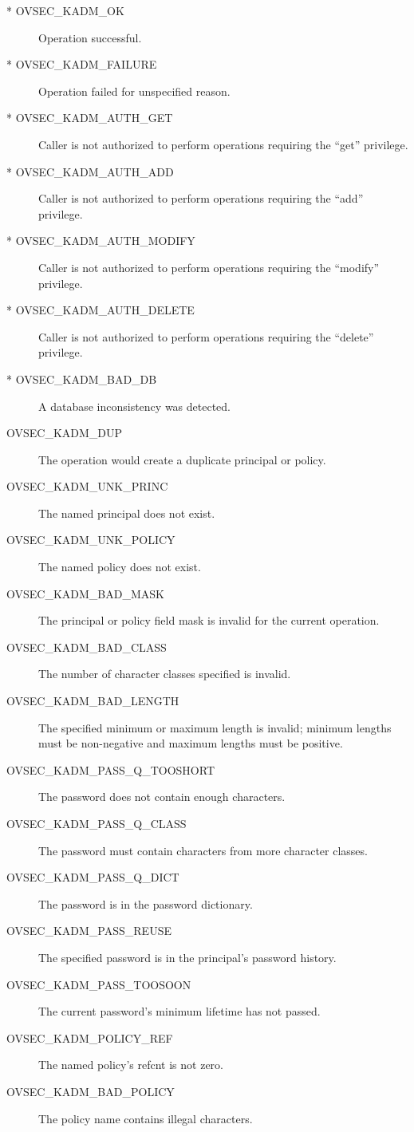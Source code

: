 \begin{description}
\item[* OVSEC_KADM_OK] Operation successful.
\item[* OVSEC_KADM_FAILURE] Operation failed for unspecified reason.
\item[* OVSEC_KADM_AUTH_GET] Caller is not authorized to perform
operations requiring the ``get'' privilege.
\item[* OVSEC_KADM_AUTH_ADD] Caller is not authorized to perform
operations requiring the ``add'' privilege.
\item[* OVSEC_KADM_AUTH_MODIFY] Caller is not authorized to perform
operations requiring the ``modify'' privilege.
\item[* OVSEC_KADM_AUTH_DELETE] Caller is not authorized to perform
operations requiring the ``delete'' privilege.
\item[* OVSEC_KADM_BAD_DB] A database inconsistency was detected.
\item[OVSEC_KADM_DUP] The operation would create a duplicate principal or
policy.
\item[OVSEC_KADM_UNK_PRINC]  The named principal does not exist.
\item[OVSEC_KADM_UNK_POLICY] The named policy does not exist.
\item[OVSEC_KADM_BAD_MASK] The principal or policy field mask is invalid
for the current operation.
\item[OVSEC_KADM_BAD_CLASS] The number of character classes specified
is invalid.
\item[OVSEC_KADM_BAD_LENGTH] The specified minimum or maximum length
is invalid; minimum lengths must be non-negative and maximum lengths
must be positive.
\item[OVSEC_KADM_PASS_Q_TOOSHORT] The password does not contain enough
characters.
\item[OVSEC_KADM_PASS_Q_CLASS] The password must contain characters
from more character classes.
\item[OVSEC_KADM_PASS_Q_DICT] The password is in the password
dictionary.
\item[OVSEC_KADM_PASS_REUSE] The specified password is in the principal's
password history.
\item[OVSEC_KADM_PASS_TOOSOON] The current password's minimum lifetime
has not passed.
\item[OVSEC_KADM_POLICY_REF] The named policy's refcnt is not zero.
\item[OVSEC_KADM_BAD_POLICY] The policy name contains illegal
characters.
\end{description}

